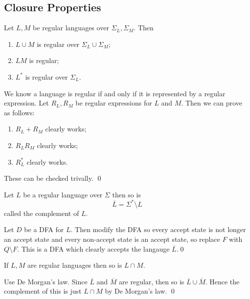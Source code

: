 \documentclass[tikx, border = 10pt]{article}
\begin{document}
\subsection{Closure Properties}
\begin{theorem}
  Let $ L,M $ be regular languages over $ \Sigma_L, \Sigma_M $. Then
  \begin{enumerate}
	  \item $ L \cup M $ is regular over $ \Sigma_L \cup \Sigma_M $;
	  \item $ LM $ is regular;
	  \item $ L^* $ is regular over $ \Sigma_L $.
  \end{enumerate}
\end{theorem}
\pf We know a language is regular if and only if it is represented by a regular expression. Let $ R_L, R_M $ be regular expressions for $ L $ and $ M $. Then we can prove as follows:
\begin{enumerate}
	\item $ R_L+R_M $ clearly works;
	\item $ R_LR_M $ clearly works;
	\item $ R_L^* $ clearly works.
\end{enumerate}
These can be checked trivally. \qed
\begin{theorem}
  Let $ L $ be a regular language over $ \Sigma $ then so is 
  \[
    \overline L = \Sigma^* \setminus L
  \]
  called the complement of $ L $.
\end{theorem}
\pf Let $ D $ be a DFA for $ L $. Then modify the DFA so every accept state is not longer an accept state and every non-accept state is an accept state, so replace $ F $ with $ Q\setminus F $. This is a DFA which clearly accepts the langauge $ \overline L $.\qed
\begin{corollary}
  If $ L,M $ are regular languages then so is $ L\cap M $.
\end{corollary}
\pf Use De Morgan's law. Since $ \overline L $ and $ \overline M $ are regular, then so is $ \overline L \cup \overline M $. Hence the complement of this is just $ L \cap M $ by De Morgan's law. \qed
\end{document}

